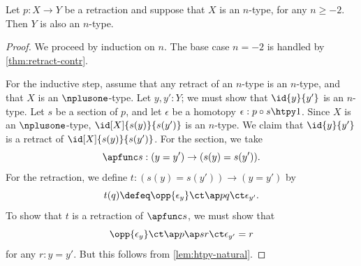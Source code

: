 %
\begin{thm}\label{thm:h-level-retracts}
 Let $p : X \to Y$ be a retraction and suppose that $X$ is an $n$-type, for any $n\geq -2$.
 Then $Y$ is also an $n$-type.
\end{thm}

\begin{proof}
 We proceed by induction on $n$.
 The base case $n=-2$ is handled by \cref{thm:retract-contr}.

 For the inductive step, assume that any retract of an $n$-type is an $n$-type, and that $X$ is an $\nplusone$-type.
 Let $y, y' : Y$; we must show that $\id{y}{y'}$ is an $n$-type.
 Let $s$ be a section of $p$, and let $\epsilon$ be a homotopy $\epsilon : p \circ s \htpy 1$.
 Since $X$ is an $\nplusone$-type, $\id[X]{s(y)}{s(y')}$ is an $n$-type.
 We claim that $\id{y}{y'}$ is a retract of $\id[X]{s(y)}{s(y')}$.
 For the section, we take
 \[ \apfunc s : (y=y') \to (s(y)=s(y')). \]
 For the retraction, we define $t:(s(y)=s(y'))\to(y=y')$ by
 \[ t(q) \defeq  \opp{\epsilon_y} \ct \ap p q \ct \epsilon_{y'}.\]
 To show that $t$ is a retraction of $\apfunc s$, we must show that
 \[ \opp{\epsilon_y} \ct \ap p {\ap sr} \ct \epsilon_{y'} = r \]
 for any $r:y=y'$.
 But this follows from \cref{lem:htpy-natural}.
\end{proof}
